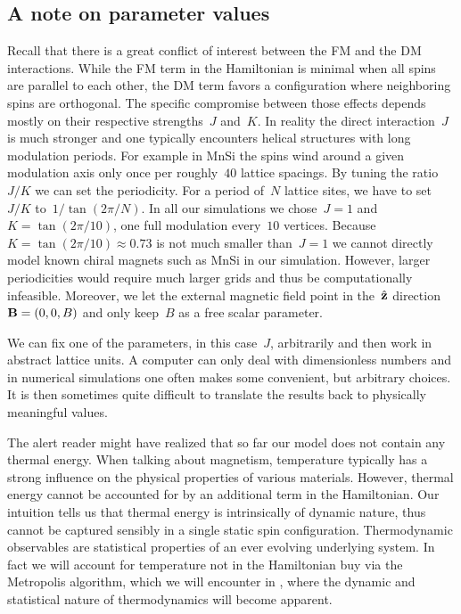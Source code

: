 \subsection{A note on parameter values}

Recall that there is a great conflict of interest between the FM and the DM
interactions. While the FM term in the Hamiltonian is minimal when all spins are
parallel to each other, the DM term favors a configuration where neighboring
spins are orthogonal. The specific compromise between those effects depends
mostly on their respective strengths~$J$ and~$K$. In reality the direct
interaction~$J$ is much stronger and one typically encounters helical structures
with long modulation periods. For example in MnSi the spins wind around a given
modulation axis only once per roughly~$40$ lattice spacings.  By tuning the
ratio~$J/K$ we can set the periodicity. For a period of~$N$ lattice sites, we
have to set~$J/K$ to~$1/\tan(2\pi / N)$. In all our simulations we chose~$J=1$
and~$K=\tan(2\pi / 10)$, \ie{} one full modulation every~$10$ vertices.
Because~$K=\tan(2\pi / 10)\approx 0.73$ is not much smaller than~$J=1$ we cannot
directly model known chiral magnets such as MnSi in our simulation. However,
larger periodicities would require much larger grids and thus be computationally
infeasible. Moreover, we let the external magnetic field point in the~$\hat{\mathbf{z}}$
direction~$\mathbf{B}=(0,0,B)$ and only keep~$B$ as a free scalar parameter.

We can fix one of the parameters, in this case~$J$, arbitrarily and then work in
abstract lattice units. A computer can only deal with dimensionless numbers and
in numerical simulations one often makes some convenient, but arbitrary choices.
It is then sometimes quite difficult to translate the results back to physically
meaningful values.

The alert reader might have realized that so far our model does not contain any
thermal energy. When talking about magnetism, temperature typically has a strong
influence on the physical properties of various materials. However, thermal
energy cannot be accounted for by an additional term in the Hamiltonian. Our
intuition tells us that thermal energy is intrinsically of dynamic nature, thus
cannot be captured sensibly in a single static spin configuration. Thermodynamic
observables are statistical properties of an ever evolving underlying system. In
fact we will account for temperature not in the Hamiltonian buy via the
Metropolis algorithm, which we will encounter in , where
the dynamic and statistical nature of thermodynamics will become apparent.

